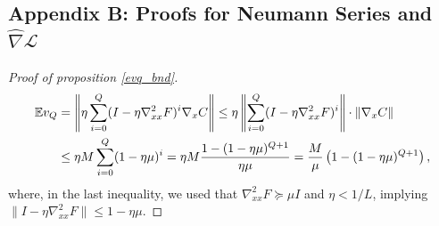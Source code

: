 \documentclass[11pt, twoside]{report}
\begin{document}
\subsection*{Appendix B: Proofs for Neumann Series and $\widehat{\nabla} \mathcal{L}$} \label{AppendixB}
\begin{proof}[Proof of proposition \ref{evq_bnd}]

\begin{align}
\mathbb{E}v_Q 
&= \left\| \eta \sum_{i=0}^Q (I - \eta \nabla_{xx}^2 F)^i \nabla_x C \right\| \leq \eta \left\| \sum_{i=0}^Q (I - \eta \nabla_{xx}^2 F)^i \right\| \cdot \|\nabla_x C\| \notag \\
&\leq \eta M \sum_{i=0}^Q (1 - \eta\mu)^i = \eta M \frac{1 - (1 - \eta\mu)^{Q+1}}{\eta\mu} \notag = \frac{M}{\mu} \left( 1 - (1 - \eta\mu)^{Q+1} \right),
\end{align}
where, in the last inequality, we used that $\nabla_{xx}^2F \succeq \mu I$ and $\eta < 1/L$, implying $\|I-\eta\nabla_{xx}^2F\|\le 1-\eta\mu$.
\end{proof}
\end{document}
